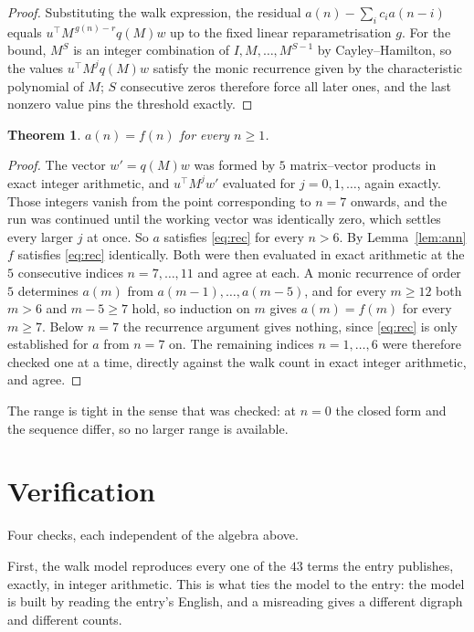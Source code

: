 \documentclass[11pt,a4paper]{article}
\theoremstyle{plain}
\newtheorem{theorem}{Theorem}
\theoremstyle{definition}
\begin{document}
\begin{proof}
Substituting the walk expression, the residual $a(n)-\sum_ic_ia(n-i)$ equals
$u^{\!\top}M^{\,g(n)-r}q(M)w$ up to the fixed linear reparametrisation $g$. For the bound,
$M^{S}$ is an integer combination of $I,M,\dots,M^{S-1}$ by Cayley--Hamilton, so the values
$u^{\!\top}M^{j}q(M)w$ satisfy the monic recurrence given by the characteristic polynomial of
$M$; $S$ consecutive zeros therefore force all later ones, and the last nonzero value pins the
threshold exactly.
\end{proof}

\begin{theorem}
$a(n)=f(n)$ for every $n\ge1$.
\end{theorem}

\begin{proof}
The vector $w'=q(M)w$ was formed by $5$ matrix--vector products in exact integer
arithmetic, and $u^{\!\top}M^{j}w'$ evaluated for $j=0,1,\dots$, again exactly. Those integers
vanish from the point corresponding to $n=7$ onwards, and the run was continued until the
working vector was identically zero, which settles every larger $j$ at once. So $a$ satisfies
\eqref{eq:rec} for every $n>6$. By Lemma~\ref{lem:ann} $f$ satisfies \eqref{eq:rec}
identically. Both were then evaluated in exact arithmetic at the $5$ consecutive indices
$n=7,\dots,11$ and agree at each. A monic recurrence of order $5$
determines $a(m)$ from $a(m-1),\dots,a(m-5)$, and for every $m\ge12$ both
$m>6$ and $m-5\ge7$ hold, so induction on $m$ gives $a(m)=f(m)$ for every
$m\ge7$.
Below $n=7$ the recurrence argument gives nothing, since \eqref{eq:rec} is only
established for $a$ from $n=7$ on. The remaining indices $n=1,\dots,6$ were
therefore checked one at a time, directly against the walk count in exact integer arithmetic,
and agree.
\end{proof}

The range is tight in the sense that was checked: at $n=0$ the closed form and the sequence differ, so no larger range is available.

\section{Verification}

Four checks, each independent of the algebra above.

First, the walk model reproduces every one of the $43$ terms the entry publishes,
exactly, in integer arithmetic. This is what ties the model to the entry: the model is built
by reading the entry's English, and a misreading gives a different digraph and different
counts.
\end{document}
